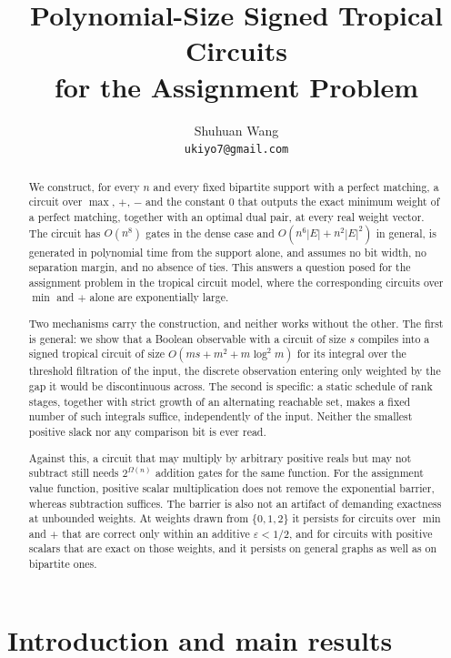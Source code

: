 \documentclass[11pt]{article}
\title{Polynomial-Size Signed Tropical Circuits\\for the Assignment Problem}
\author{Shuhuan Wang\\{\small\texttt{ukiyo7@gmail.com}}}
\date{}
\begin{document}
\maketitle

\begin{abstract}
We construct, for every $n$ and every fixed bipartite support with a perfect
matching, a circuit over $\max$, $+$, $-$ and the constant $0$ that outputs the
exact minimum weight of a perfect matching, together with an optimal dual pair,
at every real weight vector.  The circuit has $O(n^{8})$ gates in the dense case
and $O(n^{6}|E|+n^{2}|E|^{2})$ in general, is generated in polynomial time from
the support alone, and assumes no bit width, no separation margin, and no
absence of ties.  This answers a question posed for the assignment problem in
the tropical circuit model, where the corresponding circuits over $\min$ and $+$
alone are exponentially large.

Two mechanisms carry the construction, and neither works without the other.
The first is general: we show that a Boolean observable with a circuit of size
$s$ compiles into a signed tropical circuit of size $O(ms+m^{2}+m\log^{2}m)$ for
its integral over the threshold filtration of the input, the discrete
observation entering only weighted by the gap it would be discontinuous across.
The second is specific: a static schedule of rank stages, together with strict
growth of an alternating reachable set, makes a fixed number of such integrals
suffice, independently of the input.  Neither the smallest positive slack nor
any comparison bit is ever read.

Against this, a circuit that may multiply by arbitrary positive reals but may
not subtract still needs $2^{\Omega(n)}$ addition gates for the same function.
For the assignment value function, positive scalar multiplication does not
remove the exponential barrier, whereas subtraction suffices.  The barrier is
also not an artifact of demanding exactness at unbounded weights.  At weights
drawn from $\{0,1,2\}$ it persists for circuits over $\min$ and $+$ that are
correct only within an additive $\varepsilon<1/2$, and for circuits with
positive scalars that are exact on those weights, and it persists on general
graphs as well as on bipartite ones.
\end{abstract}

\section{Introduction and main results}
\label{sec:intro}
\end{document}
